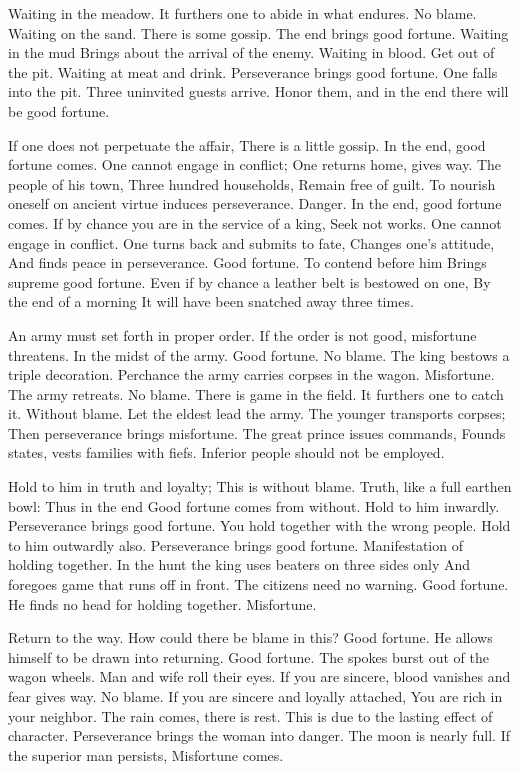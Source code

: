 {Waiting in the meadow.
 It furthers one to abide in what endures.
 No blame.}
{Waiting on the sand.
 There is some gossip.
 The end brings good fortune.}
{Waiting in the mud
 Brings about the arrival of the enemy.}
{Waiting in blood.
 Get out of the pit.}
{Waiting at meat and drink.
 Perseverance brings good fortune.}
{One falls into the pit.
 Three uninvited guests arrive.
 Honor them, and in the end there will be good fortune.}

{If one does not perpetuate the affair,
 There is a little gossip.
 In the end, good fortune comes.}
{One cannot engage in conflict;
 One returns home, gives way.
 The people of his town,
 Three hundred households,
 Remain free of guilt.}
{To nourish oneself on ancient virtue induces perseverance.
 Danger. In the end, good fortune comes.
 If by chance you are in the service of a king,
 Seek not works.}
{One cannot engage in conflict.
 One turns back and submits to fate,
 Changes one’s attitude,
 And finds peace in perseverance.
 Good fortune.}
{To contend before him
 Brings supreme good fortune.}
{Even if by chance a leather belt is bestowed on one,
 By the end of a morning
 It will have been snatched away three times.}

{An army must set forth in proper order.
 If the order is not good, misfortune threatens.}
{In the midst of the army.
 Good fortune. No blame.
 The king bestows a triple decoration.}
{Perchance the army carries corpses in the wagon.
 Misfortune.}
{The army retreats. No blame.}
{There is game in the field.
 It furthers one to catch it.
 Without blame.
 Let the eldest lead the army.
 The younger transports corpses;
 Then perseverance brings misfortune.}
{The great prince issues commands,
 Founds states, vests families with fiefs.
 Inferior people should not be employed.}

{Hold to him in truth and loyalty;
 This is without blame.
 Truth, like a full earthen bowl:
 Thus in the end
 Good fortune comes from without.}
{Hold to him inwardly.
 Perseverance brings good fortune.}
{You hold together with the wrong people.}
{Hold to him outwardly also.
 Perseverance brings good fortune.}
{Manifestation of holding together.
 In the hunt the king uses beaters on three sides only
 And foregoes game that runs off in front.
 The citizens need no warning.
 Good fortune.}
{He finds no head for holding together.
 Misfortune.}

{Return to the way.
 How could there be blame in this?
 Good fortune.}
{He allows himself to be drawn into returning.
 Good fortune.}
{The spokes burst out of the wagon wheels.
 Man and wife roll their eyes.}
{If you are sincere, blood vanishes and fear gives way.
 No blame.}
{If you are sincere and loyally attached,
 You are rich in your neighbor.}
{The rain comes, there is rest.
 This is due to the lasting effect of character.
 Perseverance brings the woman into danger.
 The moon is nearly full.
 If the superior man persists,
 Misfortune comes.}

